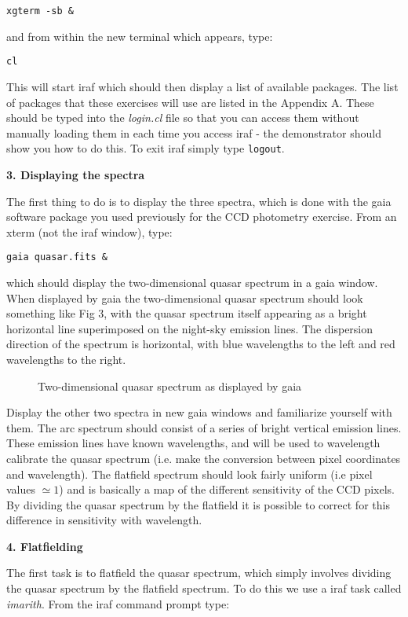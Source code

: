 {\tt \verb,xgterm -sb &,}

\noindent
and from within the new terminal which appears, type:

{\tt cl}

\noindent
This will start {\sc iraf} which should then display a list of available packages. The list of packages that these exercises will use are listed in the Appendix A. These should be typed into the {\it login.cl} file so that you can access them without manually loading them in each time you access {\sc iraf} - the demonstrator should show you how to do this. To exit {\sc iraf} simply type {\tt logout}.

{\large {\bf 3. Displaying the spectra}}

The first thing to do is to display the three spectra, which is done with the {\sc gaia} software package you used previously for the CCD photometry exercise. From an xterm (not the {\sc iraf} window), type:

{\tt gaia quasar.fits \&}

which should display the two-dimensional quasar spectrum in a {\sc gaia} window. When displayed by {\sc gaia} the two-dimensional quasar spectrum should look something like Fig 3, with the quasar spectrum itself appearing as a bright horizontal line superimposed on the night-sky emission lines. The dispersion direction of the spectrum is horizontal, with blue wavelengths to the left and red wavelengths to the right.
\begin{figure}
\centerline{}
\caption{Two-dimensional quasar spectrum as displayed by {\sc gaia}}
\end{figure}

Display the other two spectra in new {\sc gaia} windows and familiarize yourself with them. The arc spectrum should consist of a series of bright vertical emission lines. These emission lines have known wavelengths, and will be used to wavelength calibrate the quasar spectrum (i.e. make the conversion between pixel coordinates and wavelength). The flatfield spectrum should look fairly uniform (i.e pixel values $\simeq1$) and is basically a map of the different sensitivity of the CCD pixels. By dividing the quasar spectrum by the flatfield it is possible to correct for this difference in sensitivity with wavelength.


{\large {\bf 4. Flatfielding}}

The first task is to flatfield the quasar spectrum, which simply involves dividing the quasar spectrum by the flatfield spectrum. To do this we use a {\sc iraf} task called {\it imarith}. From the {\sc iraf} command prompt type:

